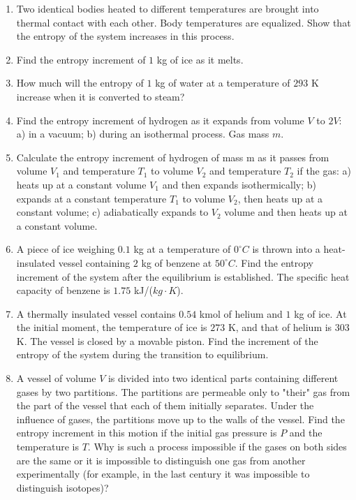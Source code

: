 \documentclass{article}
\begin{document}
\begin{enumerate}[label=5.9.\arabic*]

\item Two identical bodies heated to different temperatures are brought into thermal contact with each other. Body temperatures are equalized. Show that the entropy of the system increases in this process.

\item Find the entropy increment of $1$ kg of ice as it melts.

\item How much will the entropy of $1$ kg of water at a temperature of $293$ K increase when it is converted to steam?

\item Find the entropy increment of hydrogen as it expands from volume $V$ to $2V$: a) in a vacuum; b) during an isothermal process. Gas mass $m$.

\item Calculate the entropy increment of hydrogen of mass m as it passes from volume $V_1$ and temperature $T_1$ to volume $V_2$ and temperature $T_2$ if the gas: a) heats up at a constant volume $V_1$ and then expands isothermically; b) expands at a constant temperature $T_1$ to volume $V_2$, then heats up at a constant volume; c) adiabatically expands to $V_2$ volume and then heats up at a constant volume.

\item A piece of ice weighing $0.1$ kg at a temperature of $0^\circ C$ is thrown into a heat-insulated vessel containing $2$ kg of benzene at $50^\circ C$. Find the entropy increment of the system after the equilibrium is established. The specific heat capacity of benzene is $1.75$ kJ/($kg \cdot K$).

\item A thermally insulated vessel contains $0.54$ kmol of helium and $1$ kg of ice. At the initial moment, the temperature of ice is $273$ K, and that of helium is $303$ K. The vessel is closed by a movable piston. Find the increment of the entropy of the system during the transition to equilibrium.

\item A vessel of volume $V$ is divided into two identical parts containing different gases by two partitions. The partitions are permeable only to "their" gas from the part of the vessel that each of them initially separates. Under the influence of gases, the partitions move up to the walls of the vessel. Find the entropy increment in this motion if the initial gas pressure is $P$ and the temperature is $T$. Why is such a process impossible if the gases on both sides are the same or it is impossible to distinguish one gas from another experimentally (for example, in the last century it was impossible to distinguish isotopes)?


\end{enumerate}
\end{document}
